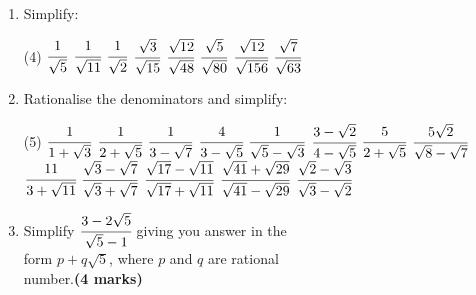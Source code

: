 \documentclass[fleqn]{article}
\begin{document}
\exercise{}
\begin{enumerate}
    \item Simplify:
        \begin{tasks}(4) %
            \task $\cfrac{1}{\sqrt{5}}$                  %
            \task $\cfrac{1}{\sqrt{11}}$                 %
            \task $\cfrac{1}{\sqrt{2}}$                  %
            \task $\cfrac{\sqrt{3}}{\sqrt{15}}$          %
            \task $\cfrac{\sqrt{12}}{\sqrt{48}}$         %
            \task $\cfrac{\sqrt{5}}{\sqrt{80}}$          %
            \task $\cfrac{\sqrt{12}}{\sqrt{156}}$        %
            \task $\cfrac{\sqrt{7}}{\sqrt{63}}$          %
        \end{tasks}
    \item Rationalise the denominators and simplify:
        \begin{tasks}(5) %
            \task $\cfrac{1}{1+\sqrt{3}}$                                %
            \task $\cfrac{1}{2+\sqrt{5}}$                                %
            \task $\cfrac{1}{3-\sqrt{7}}$                                %
            \task $\cfrac{4}{3-\sqrt{5}}$                                %
            \task $\cfrac{1}{\sqrt{5}-\sqrt{3}}$                         %
            \task $\cfrac{3-\sqrt{2}}{4-\sqrt{5}}$                       %
            \task $\cfrac{5}{2+\sqrt{5}}$                                %
            \task $\cfrac{5\sqrt{2}}{\sqrt{8}-\sqrt{7}}$                 %
            \task $\cfrac{11}{3+\sqrt{11}}$                              %
            \task $\cfrac{\sqrt{3}-\sqrt{7}}{\sqrt{3}+\sqrt{7}}$         %
            \task $\cfrac{\sqrt{17}-\sqrt{11}}{\sqrt{17}+\sqrt{11}}$     %
            \task $\cfrac{\sqrt{41}+\sqrt{29}}{\sqrt{41}-\sqrt{29}}$     %
            \task $\cfrac{\sqrt{2}-\sqrt{3}}{\sqrt{3}-\sqrt{2}}$         %
        \end{tasks}
    \setcounter{enumi}{3}
    \newpage
    \item Simplify $\cfrac{3-2\sqrt{5}}{\sqrt{5}-1}$     giving you answer in the    \\ %
          \indent form $p+q\sqrt{5}$, where $p$ and $q$ are rational                 \\
          number.\hspace*{40mm}\textbf{(4 marks)}\vspace{-4mm}                       \\
        \begin{table}[!ht]

\end{table}
\end{enumerate}
\end{document}

